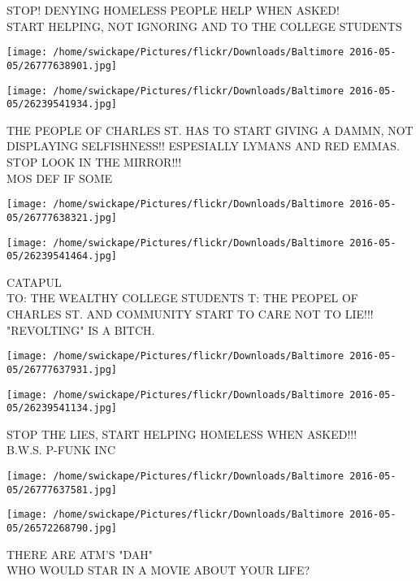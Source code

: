 \documentclass[10pt,letterpaper]{article}
\begin{document}
STOP! DENYING HOMELESS PEOPLE HELP WHEN ASKED!\\
START HELPING, NOT IGNORING  AND TO THE COLLEGE STUDENTS\\
\pagebreak

\texttt{[image: /home/swickape/Pictures/flickr/Downloads/Baltimore 2016-05-05/26777638901.jpg]}

\vspace{0.25in}
\texttt{[image: /home/swickape/Pictures/flickr/Downloads/Baltimore 2016-05-05/26239541934.jpg]}

THE PEOPLE OF CHARLES ST. HAS TO START GIVING A DAMMN, NOT DISPLAYING SELFISHNESS!! ESPESIALLY LYMANS AND RED EMMAS.  STOP LOOK IN THE MIRROR!!!\\
MOS DEF IF SOME\\
\pagebreak

\texttt{[image: /home/swickape/Pictures/flickr/Downloads/Baltimore 2016-05-05/26777638321.jpg]}

\vspace{0.25in}
\texttt{[image: /home/swickape/Pictures/flickr/Downloads/Baltimore 2016-05-05/26239541464.jpg]}

CATAPUL\\
TO: THE WEALTHY COLLEGE STUDENTS   T: THE PEOPEL OF CHARLES ST. AND COMMUNITY START TO CARE NOT TO LIE!!! "REVOLTING" IS A BITCH.\\
\pagebreak

\texttt{[image: /home/swickape/Pictures/flickr/Downloads/Baltimore 2016-05-05/26777637931.jpg]}

\vspace{0.25in}
\texttt{[image: /home/swickape/Pictures/flickr/Downloads/Baltimore 2016-05-05/26239541134.jpg]}

STOP THE LIES, START HELPING HOMELESS WHEN ASKED!!!\\
B.W.S. P{-}FUNK INC\\
\pagebreak

\texttt{[image: /home/swickape/Pictures/flickr/Downloads/Baltimore 2016-05-05/26777637581.jpg]}

\vspace{0.25in}
\texttt{[image: /home/swickape/Pictures/flickr/Downloads/Baltimore 2016-05-05/26572268790.jpg]}

THERE ARE ATM'S "DAH"\\
WHO WOULD STAR IN A MOVIE ABOUT YOUR LIFE?\\
\pagebreak
\end{document}

